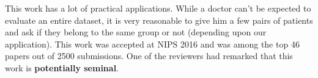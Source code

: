 \documentclass[11pt]{article}
\begin{document}
This work has a lot of practical applications. While a doctor can't be expected to evaluate an entire dataset, it is very reasonable to give him a few pairs of patients and ask if they belong to the same group or not (depending upon our application). This work was accepted at NIPS 2016 and was among the top 46 papers out of 2500 submissions. One of the reviewers had remarked that this work is \textbf{potentially seminal}. 



\end{document}
